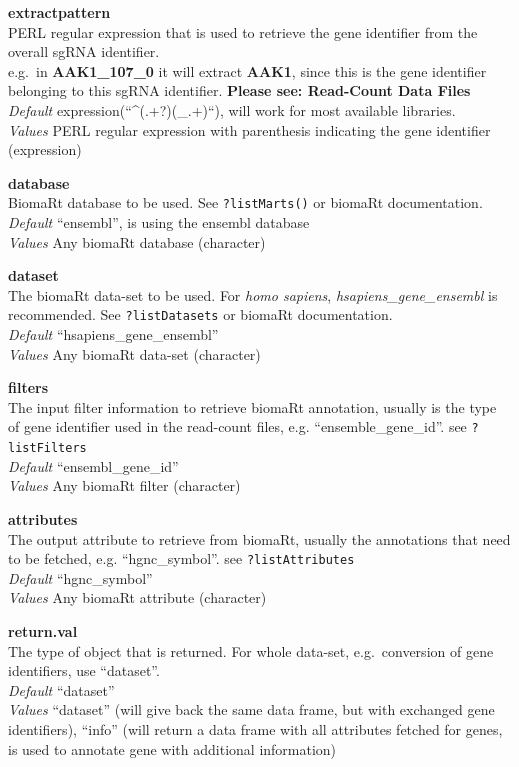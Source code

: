 \documentclass[]{article}
\begin{document}
\textbf{extractpattern}\\
PERL regular expression that is used to retrieve the gene identifier
from the overall sgRNA identifier.\\
e.g.~in \textbf{AAK1\_107\_0} it will extract \textbf{AAK1}, since this
is the gene identifier belonging to this sgRNA identifier.
\textbf{Please see: Read-Count Data Files}\\
\emph{Default} expression(``\^{}(.+?)(\_.+)``), will work for most
available libraries.\\
\emph{Values} PERL regular expression with parenthesis indicating the
gene identifier (expression)

\textbf{database}\\
BiomaRt database to be used. See \texttt{?listMarts()} or biomaRt
documentation.\\
\emph{Default} ``ensembl'', is using the ensembl database\\
\emph{Values} Any biomaRt database (character)

\textbf{dataset}\\
The biomaRt data-set to be used. For \emph{homo sapiens},
\emph{hsapiens\_gene\_ensembl} is recommended. See
\texttt{?listDatasets} or biomaRt documentation.\\
\emph{Default} ``hsapiens\_gene\_ensembl''\\
\emph{Values} Any biomaRt data-set (character)

\textbf{filters}\\
The input filter information to retrieve biomaRt annotation, usually is
the type of gene identifier used in the read-count files, e.g.
``ensemble\_gene\_id''. see \texttt{?listFilters}\\
\emph{Default} ``ensembl\_gene\_id''\\
\emph{Values} Any biomaRt filter (character)

\textbf{attributes}\\
The output attribute to retrieve from biomaRt, usually the annotations
that need to be fetched, e.g. ``hgnc\_symbol''. see
\texttt{?listAttributes}\\
\emph{Default} ``hgnc\_symbol''\\
\emph{Values} Any biomaRt attribute (character)

\textbf{return.val}\\
The type of object that is returned. For whole data-set, e.g.~conversion
of gene identifiers, use ``dataset''.\\
\emph{Default} ``dataset''\\
\emph{Values} ``dataset'' (will give back the same data frame, but with
exchanged gene identifiers), ``info'' (will return a data frame with all
attributes fetched for genes, is used to annotate gene with additional
information)
\end{document}
